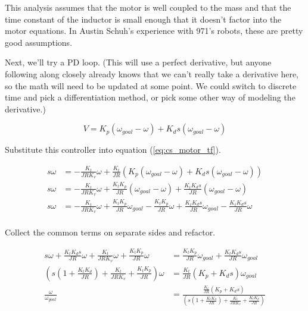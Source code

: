 \begin{remark}
  This analysis assumes that the motor is well coupled to the mass and that the
  time constant of the inductor is small enough that it doesn't factor into the
  motor equations. In Austin Schuh's experience with 971's robots, these are
  pretty good assumptions.
\end{remark}

Next, we'll try a PD loop. (This will use a perfect derivative, but anyone
following along closely already knows that we can't really take a derivative
here, so the math will need to be updated at some point. We could switch to
discrete time and pick a differentiation method, or pick some other way of
modeling the derivative.)

\begin{equation*}
  V = K_p (\omega_{goal} - \omega) + K_d s (\omega_{goal} - \omega)
\end{equation*}

Substitute this controller into equation (\ref{eq:cs_motor_tf}).

\begin{align*}
  s \omega &= -\frac{K_t}{JRK_v} \omega + \frac{K_t}{JR}
    \left(K_p (\omega_{goal} - \omega) + K_d s (\omega_{goal} - \omega)\right)
    \\
  s \omega &= -\frac{K_t}{JRK_v} \omega + \frac{K_t K_p}{JR}
    (\omega_{goal} - \omega) + \frac{K_t K_d s}{JR} (\omega_{goal} - \omega) \\
  s \omega &= -\frac{K_t}{JRK_v} \omega + \frac{K_t K_p}{JR} \omega_{goal} -
    \frac{K_t K_p}{JR} \omega + \frac{K_t K_d s}{JR} \omega_{goal} -
    \frac{K_t K_d s}{JR} \omega \\
\end{align*}

Collect the common terms on separate sides and refactor.

\begin{align*}
  s \omega + \frac{K_t K_d s}{JR} \omega + \frac{K_t}{JRK_v} \omega +
    \frac{K_t K_p}{JR} \omega &= \frac{K_t K_p}{JR} \omega_{goal} +
    \frac{K_t K_d s}{JR} \omega_{goal} \\
  \left(s \left(1 + \frac{K_t K_d}{JR}\right) + \frac{K_t}{JRK_v} +
    \frac{K_t K_p}{JR}\right) \omega &= \frac{K_t}{JR}
    \left(K_p + K_d s\right) \omega_{goal} \\
  \frac{\omega}{\omega_{goal}} &= \frac{\frac{K_t}{JR}
    \left(K_p + K_d s\right)}{\left(s \left(1 + \frac{K_t K_d}{JR}\right) +
    \frac{K_t}{JRK_v} + \frac{K_t K_p}{JR}\right)} \\
\end{align*}

